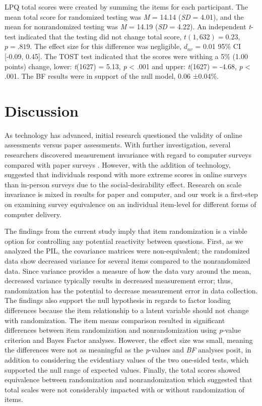 \documentclass[english,man, mask]{apa6}
\theoremstyle{definition}
\theoremstyle{definition}
\theoremstyle{definition}
\theoremstyle{remark}
\begin{document}
LPQ total scores were created by summing the items for each participant.
The mean total score for randomized testing was \emph{M} = 14.14
(\emph{SD} = 4.01), and the mean for nonrandomized testing was \emph{M}
= 14.19 (\emph{SD} = 4.22). An independent \emph{t}-test indicated that
the testing did not change total score, \(t(1,632) = 0.23\),
\(p = .819\). The effect size for this difference was negligible,
\(d_{av}\) = 0.01 95\% CI {[}-0.09, 0.45{]}. The TOST test indicated
that the scores were withing a 5\% (1.00 points) change, lower:
\emph{t}(1627) = 5.13, \emph{p} \textless{} .001 and upper:
\emph{t}(1627) = -4.68, \emph{p} \textless{} .001. The BF results were
in support of the null model, 0.06 ±0.04\%.

\section{Discussion}\label{discussion}

As technology has advanced, initial research questioned the validity of
online assessments versus paper assessments. With further investigation,
several researchers discovered measurement invariance with regard to
computer surveys compared with paper surveys
\autocites{Deutskens2006}{Lewis2009}. However, with the addition of
technology, \textcite{Fang2012a} suggested that individuals respond with
more extreme scores in online surveys than in-person surveys due to the
social-desirability effect. Research on scale invariance is mixed in
results for paper and computer, and our work is a first-step on
examining survey equivalence on an individual item-level for different
forms of computer delivery.

The findings from the current study imply that item randomization is a
viable option for controlling any potential reactivity between
questions. First, as we analyzed the PIL, the covariance matrices were
non-equivalent; the randomized data show decreased variance for several
items compared to the nonrandomized data. Since variance provides a
measure of how the data vary around the mean, decreased variance
typically results in decreased measurement error; thus, randomization
has the potential to decrease measurement error in data collection. The
findings also support the null hypothesis in regards to factor loading
differences because the item relationship to a latent variable should
not change with randomization. The item means comparison resulted in
significant differences between item randomization and nonrandomization
using \emph{p}-value criterion and Bayes Factor analyses. However, the
effect size was small, meaning the differences were not as meaningful as
the \emph{p}-values and \emph{BF} analyses posit, in addition to
considering the evidentiary values of the two one-sided tests, which
supported the null range of expected values. Finally, the total scores
showed equivalence between randomization and nonrandomization which
suggested that total scales were not considerably impacted with or
without randomization of items.
\end{document}
